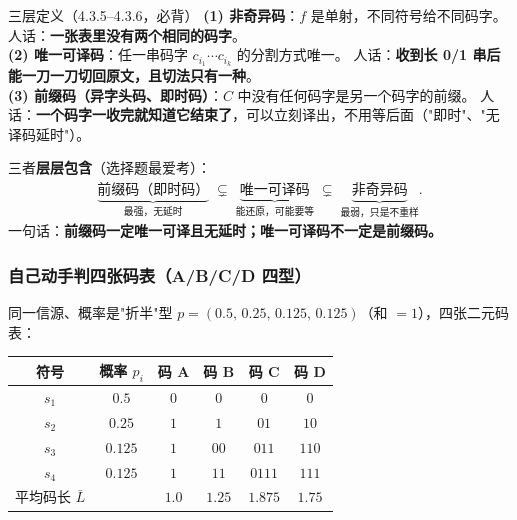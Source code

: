 \begin{defbox}{三层定义（4.3.5--4.3.6，必背）}
\textbf{(1) 非奇异码}：$f$ 是单射，不同符号给不同码字。
人话：\textbf{一张表里没有两个相同的码字}。\\
\textbf{(2) 唯一可译码}：任一串码字 $c_{i_1}\cdots c_{i_k}$ 的分割方式唯一。
人话：\textbf{收到长 0/1 串后能一刀一刀切回原文，且切法只有一种}。\\
\textbf{(3) 前缀码（异字头码、即时码）}：$C$ 中没有任何码字是另一个码字的前缀。
人话：\textbf{一个码字一收完就知道它结束了}，可以立刻译出，不用等后面（"即时"、"无译码延时"）。
\end{defbox}

三者\textbf{层层包含}（选择题最爱考）：
\begin{align*}
\underbrace{\text{前缀码（即时码）}}_{\text{最强，无延时}}\;\subsetneq\;
\underbrace{\text{唯一可译码}}_{\text{能还原，可能要等}}\;\subsetneq\;
\underbrace{\text{非奇异码}}_{\text{最弱，只是不重样}} .
\end{align*}
一句话：\textbf{前缀码一定唯一可译且无延时；唯一可译码不一定是前缀码。}

\subsubsection{自己动手判四张码表（A/B/C/D 四型）}
同一信源、概率是"折半"型 $p=(0.5,\,0.25,\,0.125,\,0.125)$（和 $=1$），四张二元码表：

\begin{center}
\begin{tabular}{@{}ccccc|c@{}}
\toprule
符号 & 概率 $p_i$ & 码 A & 码 B & 码 C & 码 D\\
\midrule
$s_1$ & $0.5$   & $0$  & $0$  & $0$    & $0$\\
$s_2$ & $0.25$  & $1$  & $1$  & $01$   & $10$\\
$s_3$ & $0.125$ & $1$  & $00$ & $011$  & $110$\\
$s_4$ & $0.125$ & $1$  & $11$ & $0111$ & $111$\\
\midrule
平均码长 $\bar L$ & & $1.0$ & $1.25$ & $1.875$ & $1.75$\\
\bottomrule
\end{tabular}
\end{center}

